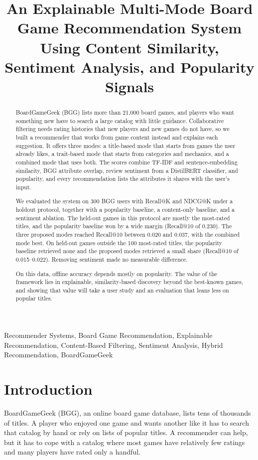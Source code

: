 \documentclass[conference]{IEEEtran}
\title{An Explainable Multi-Mode Board Game Recommendation System Using Content Similarity, Sentiment Analysis, and Popularity Signals}
\author{
\IEEEauthorblockN{Maximilliano Felix Gunawan}
\IEEEauthorblockA{
Department of Computer Science and Information Engineering\\
Asia University, Taiwan\\
Email: maxfelix05@gmail.com
}
}
\begin{document}
\maketitle

\begin{abstract}
BoardGameGeek (BGG) lists more than 21,000 board games, and players who want something new have to search a large catalog with little guidance. Collaborative filtering needs rating histories that new players and new games do not have, so we built a recommender that works from game content instead and explains each suggestion. It offers three modes: a title-based mode that starts from games the user already likes, a trait-based mode that starts from categories and mechanics, and a combined mode that uses both. The scores combine TF-IDF and sentence-embedding similarity, BGG attribute overlap, review sentiment from a DistilBERT classifier, and popularity, and every recommendation lists the attributes it shares with the user's input.

We evaluated the system on 300 BGG users with Recall@K and NDCG@K under a holdout protocol, together with a popularity baseline, a content-only baseline, and a sentiment ablation. The held-out games in this protocol are mostly the most-rated titles, and the popularity baseline won by a wide margin (Recall@10 of 0.230). The three proposed modes reached Recall@10 between 0.020 and 0.037, with the combined mode best. On held-out games outside the 100 most-rated titles, the popularity baseline retrieved none and the proposed modes retrieved a small share (Recall@10 of 0.015--0.022). Removing sentiment made no measurable difference.

On this data, offline accuracy depends mostly on popularity. The value of the framework lies in explainable, similarity-based discovery beyond the best-known games, and showing that value will take a user study and an evaluation that leans less on popular titles.
\end{abstract}

\begin{IEEEkeywords}
Recommender Systems, Board Game Recommendation, Explainable Recommendation, Content-Based Filtering, Sentiment Analysis, Hybrid Recommendation, BoardGameGeek
\end{IEEEkeywords}
\section{Introduction}

BoardGameGeek (BGG), an online board game database, lists tens of thousands of titles. A player who enjoyed one game and wants another like it has to search that catalog by hand or rely on lists of popular titles. A recommender can help, but it has to cope with a catalog where most games have relatively few ratings and many players have rated only a handful.
\end{document}
